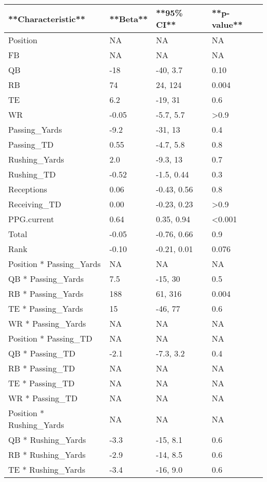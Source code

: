 
\begin{tabular}{l|l|l|l}
\hline
**Characteristic** & **Beta** & **95\% CI** & **p-value**\\
\hline
Position & NA & NA & NA\\
\hline
FB & NA & NA & NA\\
\hline
QB & -18 & -40, 3.7 & 0.10\\
\hline
RB & 74 & 24, 124 & 0.004\\
\hline
TE & 6.2 & -19, 31 & 0.6\\
\hline
WR & -0.05 & -5.7, 5.7 & >0.9\\
\hline
Passing\_Yards & -9.2 & -31, 13 & 0.4\\
\hline
Passing\_TD & 0.55 & -4.7, 5.8 & 0.8\\
\hline
Rushing\_Yards & 2.0 & -9.3, 13 & 0.7\\
\hline
Rushing\_TD & -0.52 & -1.5, 0.44 & 0.3\\
\hline
Receptions & 0.06 & -0.43, 0.56 & 0.8\\
\hline
Receiving\_TD & 0.00 & -0.23, 0.23 & >0.9\\
\hline
PPG.current & 0.64 & 0.35, 0.94 & <0.001\\
\hline
Total & -0.05 & -0.76, 0.66 & 0.9\\
\hline
Rank & -0.10 & -0.21, 0.01 & 0.076\\
\hline
Position * Passing\_Yards & NA & NA & NA\\
\hline
QB * Passing\_Yards & 7.5 & -15, 30 & 0.5\\
\hline
RB * Passing\_Yards & 188 & 61, 316 & 0.004\\
\hline
TE * Passing\_Yards & 15 & -46, 77 & 0.6\\
\hline
WR * Passing\_Yards & NA & NA & NA\\
\hline
Position * Passing\_TD & NA & NA & NA\\
\hline
QB * Passing\_TD & -2.1 & -7.3, 3.2 & 0.4\\
\hline
RB * Passing\_TD & NA & NA & NA\\
\hline
TE * Passing\_TD & NA & NA & NA\\
\hline
WR * Passing\_TD & NA & NA & NA\\
\hline
Position * Rushing\_Yards & NA & NA & NA\\
\hline
QB * Rushing\_Yards & -3.3 & -15, 8.1 & 0.6\\
\hline
RB * Rushing\_Yards & -2.9 & -14, 8.5 & 0.6\\
\hline
TE * Rushing\_Yards & -3.4 & -16, 9.0 & 0.6\\

\end{tabular}
